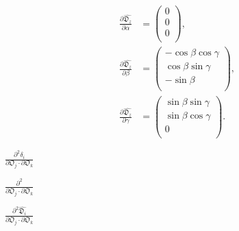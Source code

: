 \documentclass[a4paper,11pt,twoside,openright]{book}
\def\lthtmlcheckvsize{\ifdim\ht\sizebox<\vsize 
  \ifdim\wd\sizebox<\hsize\expandafter\hfill\fi \expandafter\vfill
  \else\expandafter\vss\fi}%
\begin{document}
{\newpage\clearpage
\setcounter{equation}{175}
%
\begin{subequations}\begin{align}
\frac{\partial \widehat{\mathfrak{D}_z}}{\partial \alpha} &= \begin{pmatrix}
0 \\
0 \\
0 \\
\end{pmatrix}, \\
\frac{\partial \widehat{\mathfrak{D}_z}}{\partial \beta} &= \begin{pmatrix}
-\cos \beta \cos \gamma \\
\cos \beta \sin \gamma \\
-\sin \beta \\
\end{pmatrix}, \\
\frac{\partial \widehat{\mathfrak{D}_z}}{\partial \gamma} &= \begin{pmatrix}
\sin \beta \sin \gamma \\
\sin \beta \cos \gamma \\
0 \\
\end{pmatrix}.
\end{align}\end{subequations}%
\lthtmldisplayZ
\lthtmlcheckvsize\clearpage}

{\newpage\clearpage
{}%
$\displaystyle {\frac{{\partial^2 \delta_i}}{{\partial \mathfrak{O}_j \cdot \partial \mathfrak{O}_k}}}$%
\lthtmlindisplaymathZ
\lthtmlcheckvsize\clearpage}

{\newpage\clearpage
{}%
$\displaystyle {\frac{{\partial^2}}{{\partial \mathfrak{O}_j \cdot \partial \mathfrak{O}_k}}}$%
\lthtmlindisplaymathZ
\lthtmlcheckvsize\clearpage}

{\newpage\clearpage
{}%
$\displaystyle {\frac{{\partial^2 \widehat{\mathfrak{D}_i}}}{{\partial \mathfrak{O}_j \cdot \partial \mathfrak{O}_k}}}$%
\lthtmlindisplaymathZ
\lthtmlcheckvsize\clearpage}
\end{document}
